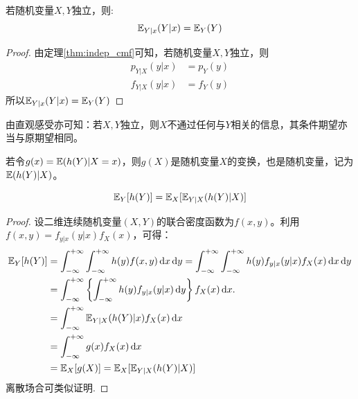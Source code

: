 \begin{proposition}
    若随机变量$X,Y$独立，则:
    \[ \mathbb{E}_{Y|x}(Y|x)=\mathbb{E}_Y(Y) \]
\end{proposition}
\begin{proof}
    由定理\ref{thm:indep_cmf}可知，若随机变量$X,Y$独立，则
    \begin{align*}
        p_{Y|X}(y|x) & =p_Y(y) \\
        f_{Y|X}(y|x) & =f_Y(y)
    \end{align*}
    所以$\mathbb{E}_{Y|x}(Y|x)=\mathbb{E}_Y(Y)$
\end{proof}
由直观感受亦可知：若$X,Y$独立，则$X$不通过任何与$Y$相关的信息，其条件期望亦当与原期望相同。

若令$g(x)=\mathbb{E}(h(Y)|X=x)$，则$g(X)$是随机变量$X$的变换，也是随机变量，记为$\mathbb{E}(h(Y)|X)$。

\begin{theorem}[重期望公式]
    \[ \mathbb{E}_Y[h(Y)] = \mathbb{E}_X[\mathbb{E}_{Y|X}(h(Y)|X)] \]
\end{theorem}
\begin{proof}
    设二维连续随机变量$(X,Y)$的联合密度函数为$f(x,y)$。利用$f(x,y)=f_{y|x}(y|x)f_X(x)$，可得：
    \begin{align*}
        \E_Y[h(Y)] & = \int_{-\infty}^{+\infty} \int_{-\infty}^{+\infty} h(y) f(x, y) \dd x \dd y=
        \int_{-\infty}^{+\infty} \int_{-\infty}^{+\infty} h(y) f_{y|x}(y|x)f_X(x) \dd x \dd y                   \\
                   & = \int_{-\infty}^{+\infty}\left\{\int_{-\infty}^{+\infty} h(y) f_{y|x}(y|x) \dd y \right\}
        f_X(x) \dd x.                                                                                           \\
                   & =\int_{-\infty}^{+\infty} \E_{Y|X}(h(Y)|x) f_X(x) \dd x                                    \\
                   & =\int_{-\infty}^{+\infty} g(x) f_X(x) \dd x                                                \\
                   & =\E_X[g(X)]=\E_X[\E_{Y|X}(h(Y)|X)]
    \end{align*}
    离散场合可类似证明.
\end{proof}

